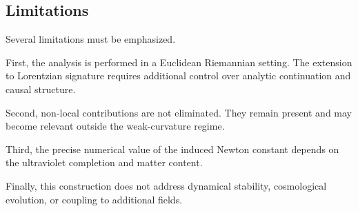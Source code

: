 \subsection{Limitations}
  \label{subsec:limitations}

  Several limitations must be emphasized.

  First, the analysis is performed in a Euclidean Riemannian setting.
  The extension to Lorentzian signature requires additional control
  over analytic continuation and causal structure.

  Second, non-local contributions are not eliminated.
  They remain present and may become relevant outside the weak-curvature regime.

  Third, the precise numerical value of the induced Newton constant
  depends on the ultraviolet completion and matter content.

  Finally, this construction does not address dynamical stability,
  cosmological evolution, or coupling to additional fields.

